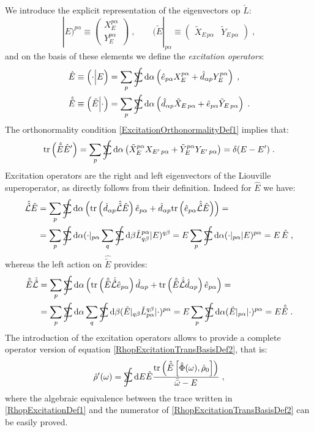 \documentclass[a4paper]{article}
\newcommand{\dd}{{\rm d}}
\newcommand{\bbomega}{{\bar{\bar\omega}}}
\newcommand{\sint}{\mathrlap{\displaystyle\int}
\mathrlap{\textstyle\sum}
\phantom{\mathrlap{\displaystyle
\int}\textstyle\sum}}
\newcommand{\be}{\begin{equation}}
\newcommand{\ee}{\end{equation}}
\newcommand{\nn}{\notag}
\newcommand{\qq}{\qquad}
\newcommand{\lb}{\label}
\newcommand{\mat}[1]{\begin{pmatrix} #1\end{pmatrix}}
\newcommand{\op}[1]{\hat {#1}}
\newcommand{\sop}[1]{\op{\op {#1}}}
\newcommand{\commutator}[2]{\left[ {#1} , {#2} \right]}
\newcommand{\trace}[1]{\mathrm{tr}\left(#1\right)}
\newcommand{\optr}[1]{\check #1}
\newcommand{\sket}[2]{| #2)^{#1}}
\newcommand{\sbra}[2]{( #2|_{#1}}
\newcommand{\dbraket}[2]{\Bigl(#1 \Bigl| #2 \Bigr)}
\newcommand{\dmnot}{\op{\rho}_0}
\newcommand{\dm}{\op{\rho}}
\newcommand{\excite}[2]{\op e_{{#1}{#2}}}
\newcommand{\decay}[2]{\op d_{{#1}{#2}}}
\newcommand{\Liouv}{\sop{\mathcal L}}
\begin{document}
We introduce the explicit representation of the eigenvectors op $\optr{L}$:
\be\lb{XYcoeffDef1}
\sket{p\alpha}{E} \equiv \mat{X_E^{p\alpha} \\ Y_E^{p\alpha}} \;, \qq
\sbra{p\alpha}{\tilde E} \equiv \mat{\tilde X_{E\,p\alpha} & \tilde Y_{E\,p\alpha}} \;,
\ee
and on the basis of these elements we define the \emph{excitation operators}:
\begin{align}\lb{ExctitationOperatorsDef1}
\op E &\equiv \dbraket{\cdot}{E} = 
\sum_p \sint \dd \alpha \left(\excite{p}{\alpha} X_E^{p\alpha} + \decay{\alpha}{p} Y_E^{p\alpha}\right) 
\;,\nn \\
\op{\tilde E} &\equiv \dbraket{\tilde E}{\cdot} = \sum_p \sint \dd \alpha \left(\decay{\alpha}{p} \tilde X_{E\,p\alpha} + 
\excite{p}{\alpha}\tilde Y_{E\,p\alpha}  \right)\;.
\end{align}
The orthonormality condition \eqref{ExcitationOrthonormalityDef1} implies that:
\be
\trace{\op{\tilde E} \op E'} = \sum_p\sint \dd\alpha \left(\tilde X_E^{p\alpha} X_{E'\,p\alpha} +
\tilde Y_E^{p\alpha} Y_{E'\,p\alpha}\right) = \delta(E-E') \;. 
\ee
Excitation operators are the right and left eigenvectors of the Liouville superoperator, as directly follows from their
definition. Indeed for $\op E$ we have:
\begin{align}\lb{opEeigenvalueDef1}
\Liouv \op E & = \sum_p \sint \dd \alpha \left(\trace{\decay{\alpha}{p} \Liouv \op E} \excite{p}{\alpha} + 
\decay{\alpha}{p} \trace{ \excite{p}{\alpha} \Liouv \op E}  \right) = \nn \\
&= \sum_p \sint  \dd \alpha \sbra{p\alpha}{\cdot} \sum_q \sint  \dd \beta \optr{L}^{p \alpha}_{q\beta} \sket{q\beta}{E} 
= E \sum_p \sint \dd \alpha \sbra{p\alpha}{\cdot} \sket{p\alpha}{E} = E \, \op E \;,	
\end{align}
whereas the left action on $\op{\tilde E}$ provides:
\begin{align}\lb{optildeEeigenvalueDef1}
 \op{\tilde E} \Liouv &=  \sum_p \sint \dd \alpha \left(
\trace{\op{\tilde E}\Liouv\excite{p}{\alpha}}\decay{\alpha}{p} +  
\trace{\op{\tilde E}\sop{\mathcal L}\decay{\alpha}{p}} \excite{p}{\alpha} \right) = 
\nn \\ &= \sum_p \sint  \dd \alpha  \sum_q \sint  \dd \beta
\sbra{q\beta}{\tilde E}\optr{L}^{q\beta}_{p\alpha}\sket{p\alpha}{\cdot} = 
E\sum_p \sint \dd \alpha \sbra{p\alpha}{\tilde E} \sket{p\alpha}{\cdot}  =
E \op{\tilde E} \;.
\end{align}
The introduction of the excitation operators allows to provide a complete operator version of equation \eqref{RhopExcitationTransBasisDef2}, that is:
\be\lb{RhopExcitationDef1}
\dm'(\omega) = 
\sint\dd E \op E
\frac{\trace{\op{\tilde E}\commutator{\op\Phi(\omega)}{\dmnot}}}{\bbomega-E} \;,
\ee
where the algebraic equivalence between the trace written in \eqref{RhopExcitationDef1} and the numerator of \eqref{RhopExcitationTransBasisDef2}
can be easily proved.
\end{document}
